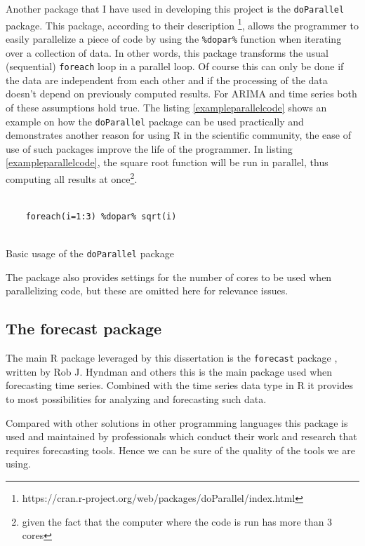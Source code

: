 \documentclass[12pt,a4paper,titlepage]{report}
\begin{document}
Another package that I have used in developing this project is the \texttt{doParallel} package. This package, according to their description \footnote{https://cran.r-project.org/web/packages/doParallel/index.html}, allows the programmer to easily parallelize a piece of code by using the \texttt{\%dopar\%} function when iterating over a collection of data. In other words, this package transforms the usual (sequential) \texttt{foreach} loop in a parallel loop. Of course this can only be done if the data are independent from each other and if the processing of the data doesn't depend on previously computed results. For ARIMA and time series both of these assumptions hold true. The listing \ref{exampleparallelcode} shows an example on how the \texttt{doParallel} package can be used practically and demonstrates another reason for using R in the scientific community, the ease of use of such packages improve the life of the programmer. In listing \ref{exampleparallelcode}, the square root function will be run in parallel, thus computing all results at once\footnote{given the fact that the computer where the code is run has more than 3 cores}.

\begin{listing}[h]
    \begin{verbatim}
    
    foreach(i=1:3) %dopar% sqrt(i)    
    
    \end{verbatim}
    
    \caption{Basic usage of the \texttt{doParallel} package}
    \label{exampleparallelcode}
\end{listing}

The package also provides settings for the number of cores to be used when parallelizing code, but these are omitted here for relevance issues.

\subsection{The forecast package} \label{forecastpackagesection}

The main R package leveraged by this dissertation is the \texttt{forecast} package \cite{forecastpackagemanual}, written by Rob J. Hyndman and others \cite{forecastpackagearticle} this is the main package used when forecasting time series.
Combined with the time series data type in R it provides to most possibilities for analyzing and forecasting such data.

Compared with other solutions in other programming languages this package is used and maintained by professionals which conduct their work and research that requires forecasting tools. Hence we can be sure of the quality of the tools we are using.
\end{document}
